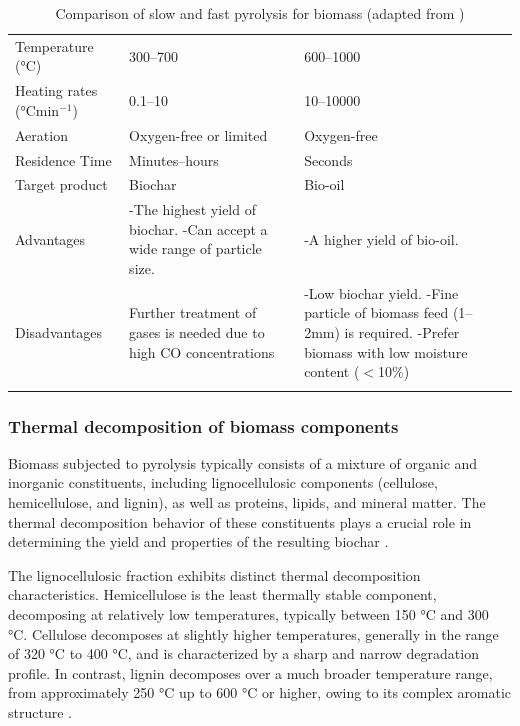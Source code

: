 \begin{table}[H]
\centering
\caption{Comparison of slow and fast pyrolysis for biomass (adapted from \textcite{Tan2021})}
\label{tab:pyrolysis_comparison}
\begin{tabular}{L{2.5cm} L{6cm} L{6cm}}
\toprule
{} &  &  \\
\midrule
Temperature (°C) & 300–700 & 600–1000 \\ \addlinespace
Heating rates (°Cmin$^{-1}$) & 0.1–10 & 10–10000 \\ \addlinespace
Aeration & Oxygen-free or limited & Oxygen-free \\ \addlinespace
Residence Time & Minutes–hours & Seconds \\ \addlinespace
Target product & Biochar & Bio-oil \\ \addlinespace
Advantages & -The highest yield of biochar. \newline -Can accept a wide range of particle size. & -A higher yield of bio-oil. \\ \addlinespace
Disadvantages & Further treatment of gases is needed due to high CO concentrations & -Low biochar yield. \newline -Fine particle of biomass feed (1–2mm) is required. \newline -Prefer biomass with low moisture content ($<$10\%) \\ \addlinespace
\bottomrule
\end{tabular}
\end{table}


\subsubsection{Thermal decomposition of biomass components}
Biomass subjected to pyrolysis typically consists of a mixture of organic and inorganic constituents, including lignocellulosic components (cellulose, hemicellulose, and lignin), as well as proteins, lipids, and mineral matter. The thermal decomposition behavior of these constituents plays a crucial role in determining the yield and properties of the resulting biochar \cite{Yang2007,Wen2021}.

\vspace{0.3em}

The lignocellulosic fraction exhibits distinct thermal decomposition characteristics. Hemicellulose is the least thermally stable component, decomposing at relatively low temperatures, typically between 150 °C and 300 °C. Cellulose decomposes at slightly higher temperatures, generally in the range of 320 °C to 400 °C, and is characterized by a sharp and narrow degradation profile. In contrast, lignin decomposes over a much broader temperature range, from approximately 250 °C up to 600 °C or higher, owing to its complex aromatic structure \cite{ElSayed2023,Chen2026}.

